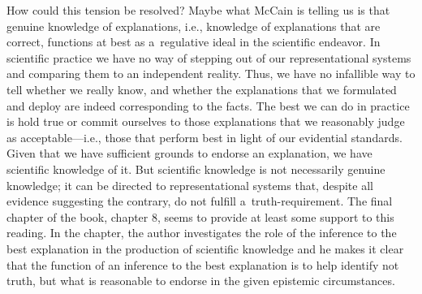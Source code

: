 How could this tension be resolved? Maybe what McCain is telling us is that genuine knowledge of explanations, i.e., knowledge of explanations that are correct, functions at best as a~regulative ideal in the scientific endeavor. In scientific practice we have no way of stepping out of our representational systems and comparing them to an independent reality. Thus, we have no infallible way to tell whether we really know, and whether the explanations that we formulated and deploy are indeed corresponding to the facts. The best we can do in practice is hold true or commit ourselves to those explanations that we reasonably judge as acceptable---i.e., those that perform best in light of our evidential standards. Given that we have sufficient grounds to endorse an explanation, we have scientific knowledge of it. But scientific knowledge is not necessarily genuine knowledge; it can be directed to representational systems that, despite all evidence suggesting the contrary, do not fulfill a~truth-requirement. The final chapter of the book, chapter 8, seems to provide at least some support to this reading. In the chapter, the author investigates the role of the inference to the best explanation in the production of scientific knowledge and he makes it clear that the function of an inference to the best explanation is to help identify not truth, but what is reasonable to endorse in the given epistemic circumstances.

